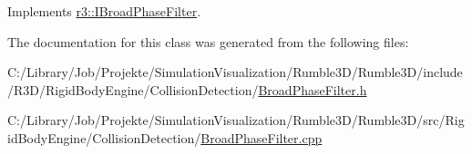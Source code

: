 Implements \mbox{\hyperlink{classr3_1_1_i_broad_phase_filter_a5f437f6390a8f10bf96d72e35e3b4432}{r3\+::\+I\+Broad\+Phase\+Filter}}.



The documentation for this class was generated from the following files\+:\begin{DoxyCompactItemize}
\item 
C\+:/\+Library/\+Job/\+Projekte/\+Simulation\+Visualization/\+Rumble3\+D/\+Rumble3\+D/include/\+R3\+D/\+Rigid\+Body\+Engine/\+Collision\+Detection/\mbox{\hyperlink{_broad_phase_filter_8h}{Broad\+Phase\+Filter.\+h}}\item 
C\+:/\+Library/\+Job/\+Projekte/\+Simulation\+Visualization/\+Rumble3\+D/\+Rumble3\+D/src/\+Rigid\+Body\+Engine/\+Collision\+Detection/\mbox{\hyperlink{_broad_phase_filter_8cpp}{Broad\+Phase\+Filter.\+cpp}}\end{DoxyCompactItemize}
